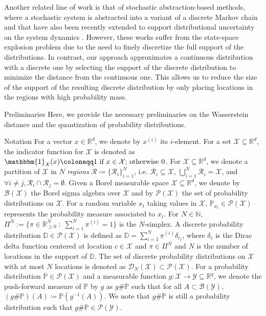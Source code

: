 \documentclass[11pt, a4paper, oneside,reqno]{amsart}
\makeatletter
\def\section{\@startsection{section}{1}%
	\z@{.7\linespacing\@plus\linespacing}{.5\linespacing}%
	{\normalfont\large\bfseries}}
\def\subsection{\@startsection{subsection}{2}%
	\z@{.5\linespacing\@plus.7\linespacing}{.5\linespacing}%
	{\normalfont\bfseries}}
\theoremstyle{plain}
\def\probMeas{{\mathcal{P}}}
\def\discMeas{{\mathcal{D}}}
\def\prob{\mathbb{P}}
\def\probD{\mathbb{D}}
\def\indicator{{\mathbbm{1}}}
\def\realNum{{\mathbb{R}}}
\def\natNum{\mathbb{N}}
\def\sSimplex{\Pi}
\def\sP{{\mathcal{P}}}
\def\sR{{\mathcal{R}}}
\def\sX{{\mathcal{X}}}
\def\sY{{\mathcal{Y}}}
\def\bsR{{\bm{\mathcal{R}}}}
\def\vpi{{{\pi}}}
\def\vc{{{c}}}
\newcommand{\evpi}[1]{{\vpi^{(#1)}}}
\makeatother
\begin{document}
Another related line of work is that of stochastic abstraction-based methods, where a stochastic system is abstracted into a variant of a discrete Markov chain \cite{abate2010approximate,kushner1990numerical} and that have also been recently extended to support distributional uncertainty on the system dynamics \cite{gracia2025efficient}.  However, these works suffer from the state-space explosion problem due to the need to finely discretize the full support of the distributions. In contrast, our approach approximates a continuous distribution with a discrete one by selecting the support of the discrete distribution to minimize the distance from the continuous one. This allows us to reduce the size of the support of the resulting discrete distribution by only placing locations in the regions with high probability mass. 


\section{Preliminaries}
Here, we provide the necessary preliminaries on the Wasserstein distance and the quantization of probability distributions.

\subsection{Notation}
For a vector $x \in \realNum^d$,  we denote by $x^{(i)}$ its $i$-element. For a set $\sX \subseteq \realNum^d$, the indicator function for $\sX$  is denoted as $\indicator_{\sX}(x) \coloneqq 1 \text{ if } x \in \sX \text{; otherwise } 0$. For $\sX \subseteq \realNum^d$, we denote a partition of $\sX$ in $N$ \emph{regions} $\bsR \coloneqq \big\{ \sR_i \big\}_{i=1}^N$, i.e. $\sR_i \subseteq \sX$, $\bigcup_{i=1}^N \sR_i = \sX$, and  $\forall i \neq j, \sR_i \cap \sR_j = \emptyset$.
Given a Borel measurable space $\sX \subseteq \realNum^d$, we denote by $\mathcal{B}(\sX)$ the Borel sigma algebra over $\sX$ and by $\sP(\sX)$ the set of probability distributions on $\sX$.
For a random variable $x_{t}$ taking values in $\sX$, $\prob_{x_t} \in \sP(\sX)$ represents the probability measure associated to $x_t$. 
For $N \in \natNum$, $\sSimplex^N := \{ \pi \in \realNum^{N}_{\geq 0} \; : \; \sum_{i=1}^{N} \evpi{i} = 1 \}$ is the $N$-simplex. A discrete probability distribution $\probD \in \probMeas(\sX)$ is defined as $\probD=\sum_{i=1}^N\evpi{i}\delta_{\vc_i}$, where $\delta_\vc$ is the Dirac delta function centered at location $\vc \in \sX$ and  $\pi \in \sSimplex^N$ and $N$ is the number of locations in the support of $\probD$. The set of discrete probability distributions on $\sX$ with at most $N$ locations is denoted as $\discMeas_N(\sX)\subset \mathcal{P}(\sX)$. For a probability distribution ${\prob} \in \sP(\sX)$ and a measurable function $g: \sX \rightarrow \sY \subseteq \realNum^{q}$, we denote the push-forward measure of ${\prob}$ by $g$ as $g \# {\prob}$ such that for all $A \subset\mathcal{B}(\sY)$, $(g \# \prob)(A) \coloneqq \prob(g^{-1}(A))$. We note that $g \# \prob$ is still a probability distribution such that $g \# \prob \in \sP(\sY)$.
\end{document}
